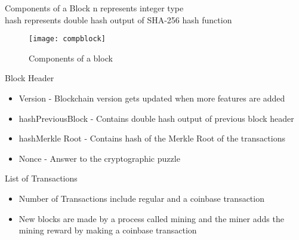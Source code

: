 \documentclass{beamer}
\begin{document}
\begin{frame}{Components of a Block}
n represents integer type \\
hash represents double hash output of SHA-256 hash function
\begin{figure}[H]\centering 
\texttt{[image: compblock]}
\caption{Components of a block}
\end{figure}
    
\end{frame}
\begin{frame}{Block Header}
\begin{itemize}
    \item Version - Blockchain version gets updated when more features are added
    \item hashPreviousBlock - Contains double hash output of previous block header
    \item hashMerkle Root - Contains hash of the Merkle Root of the transactions
    \item Nonce - Answer to the cryptographic puzzle
\end{itemize}

 
\end{frame}
\begin{frame}{List of Transactions}
\begin{itemize}
    \item Number of Transactions include regular and a coinbase transaction
    \item New blocks are made by a process called mining and the miner adds the mining reward by making a coinbase transaction
\end{itemize}


\end{frame}



\end{document}

